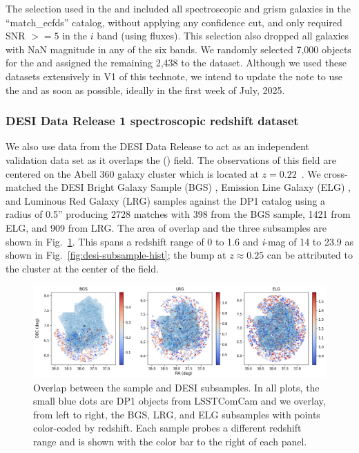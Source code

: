 The  selection used in the  and  
included all spectroscopic and grism galaxies in the ``match\_ecfds'' catalog, without applying 
any confidence cut, and only required SNR $>= 5$ in the $i$ band (using  fluxes).   
This selection also dropped all galaxies with NaN magnitude in any of the six bands.
We randomly selected 7,000 objects for the  and assigned the remaining 2,438 to the 
  dataset. Although we used these datasets extensively in V1 of this technote, 
we intend to update the note to use the  and  as soon as possible, 
ideally in the first week of July, 2025.


\subsubsection{DESI Data Release 1 spectroscopic redshift dataset}
\label{sec:data:desi}

We also use data from the DESI Data Release \citep{desi-dr1} to act as an independent validation data set as it overlaps the  () field.
The observations of this field are centered on the Abell 360 galaxy cluster which is located at $z=0.22$~\citep{A360z}.
We cross-matched the DESI Bright Galaxy Sample (BGS) \citep{BGS}, Emission Line Galaxy (ELG) \citep{ELG}, and Luminous Red Galaxy (LRG) \citep{LRG} samples against the DP1 catalog using a radius of 0.5'' producing 2728  matches with 398 from the BGS sample, 1421 from ELG, and 909 from LRG.
The area of overlap and the three subsamples are shown in Fig.~\ref{fig:desi-overlap}.
This spans a redshift range of 0 to 1.6 and \textit{i}-mag of 14 to 23.9 as shown in Fig.~\ref{fig:desi-subsample-hist}; the bump at $z\approx0.25$ can be attributed to the cluster at the center of the field.


\begin{figure}[ht]
    \centering
    \includegraphics[width=\linewidth]{figures/desi_sample_overlap.png}
    \caption{Overlap between the  sample and DESI subsamples. In all plots, the small blue dots are DP1 objects from LSSTComCam and we overlay, from left to right, the BGS, LRG, and ELG subsamples with points color-coded by redshift. Each sample probes a different redshift range and is shown with the color bar to the right of each panel.}
    \label{fig:desi-overlap}
\end{figure}

